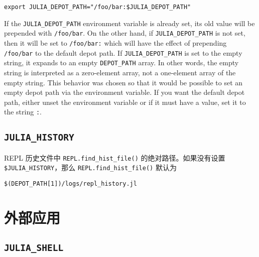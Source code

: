 \begin{lstlisting}
export JULIA_DEPOT_PATH="/foo/bar:$JULIA_DEPOT_PATH"
\end{lstlisting}



If the \texttt{JULIA\_DEPOT\_PATH} environment variable is already set, its old value will be prepended with \texttt{/foo/bar}. On the other hand, if \texttt{JULIA\_DEPOT\_PATH} is not set, then it will be set to \texttt{/foo/bar:} which will have the effect of prepending \texttt{/foo/bar} to the default depot path. If \texttt{JULIA\_DEPOT\_PATH} is set to the empty string, it expands to an empty \texttt{DEPOT\_PATH} array. In other words, the empty string is interpreted as a zero-element array, not a one-element array of the empty string. This behavior was chosen so that it would be possible to set an empty depot path via the environment variable. If you want the default depot path, either unset the environment variable or if it must have a value, set it to the string \texttt{:}.



\hypertarget{7464422147684280847}{}


\subsection{\texttt{JULIA\_HISTORY}}



REPL 历史文件中 \texttt{REPL.find\_hist\_file()} 的绝对路径。如果没有设置 \texttt{\$JULIA\_HISTORY}，那么 \texttt{REPL.find\_hist\_file()} 默认为




\begin{lstlisting}
$(DEPOT_PATH[1])/logs/repl_history.jl
\end{lstlisting}



\hypertarget{3466341700032254278}{}


\section{外部应用}



\hypertarget{12177211249965413749}{}


\subsection{\texttt{JULIA\_SHELL}}



